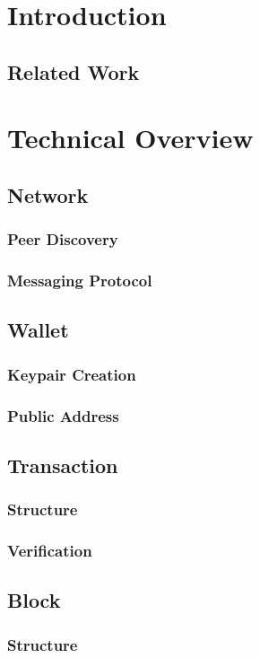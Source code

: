 \documentclass{article}
\begin{document}
\section{Introduction}
\subsection{Related Work}

\section{Technical Overview}
\subsection{Network}
\subsubsection{Peer Discovery}
\subsubsection{Messaging Protocol}

\subsection{Wallet}
\subsubsection{Keypair Creation}
\subsubsection{Public Address}

\subsection{Transaction}
\subsubsection{Structure}
\subsubsection{Verification}

\subsection{Block}
\subsubsection{Structure}
\end{document}
